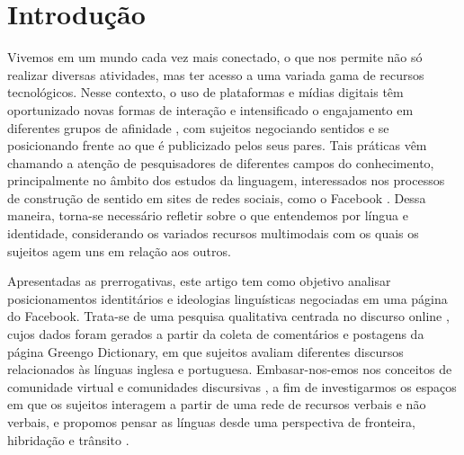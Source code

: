 \documentclass[portuguese]{textolivre}
\begin{document}
\begin{polyabstract}
\begin{english}
\begin{abstract}
\end{abstract}
\end{english}
\end{polyabstract}

\section{Introdução}\label{sec-intro}
Vivemos em um mundo cada vez mais conectado, o que nos permite não só realizar diversas atividades, mas ter acesso a uma variada gama de recursos tecnológicos. Nesse contexto, o uso de plataformas e mídias digitais têm oportunizado novas formas de interação e intensificado o engajamento em diferentes grupos de afinidade \cite{leppanen_multilingualism_2012}, com sujeitos negociando sentidos e se posicionando frente ao que é publicizado pelos seus pares. Tais práticas vêm chamando a atenção de pesquisadores de diferentes campos do conhecimento, principalmente no âmbito dos estudos da linguagem, interessados nos processos de construção de sentido em sites de redes sociais, como o Facebook \cite{bolander_constructing_2010,bolander_peter_2015,lee_micro-blogging_2011,bolander2017,dovchin_language_2020}. Dessa maneira, torna-se necessário refletir sobre o que entendemos por língua e identidade, considerando os variados recursos multimodais com os quais os sujeitos agem uns em relação aos outros.

Apresentadas as prerrogativas, este artigo tem como objetivo analisar posicionamentos identitários e ideologias linguísticas negociadas em uma página do Facebook. Trata-se de uma pesquisa qualitativa centrada no discurso online \cite{barton_linguagem_2015}, cujos dados foram gerados a partir da coleta de comentários e postagens da página Greengo Dictionary, em que sujeitos avaliam diferentes discursos relacionados às línguas inglesa e portuguesa. Embasar-nos-emos nos conceitos de comunidade virtual \cite{recuero_comunidades_2003,recuero_comunidades_2009} e comunidades discursivas \cite{swales_repensando_1992,araujo_comunidade_2020}, a fim de investigarmos os espaços em que os sujeitos interagem a partir de uma rede de recursos verbais e não verbais, e propomos pensar as línguas desde uma perspectiva de fronteira, hibridação e trânsito \cite{moita_lopes_ingles_2008,moita_lopes_ideologia_2013}.
\end{document}

